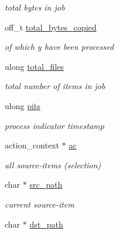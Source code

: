 \begin{CompactItemize}
\begin{CompactList}\small\item\em total bytes in job \item\end{CompactList}\item 
\hypertarget{struct__noir__job_o12}{
off\_\-t \hyperlink{struct__noir__job_o12}{total\_\-bytes\_\-copied}}
\label{struct__noir__job_o12}

\begin{CompactList}\small\item\em of which y have been processed \item\end{CompactList}\item 
\hypertarget{struct__noir__job_o13}{
ulong \hyperlink{struct__noir__job_o13}{total\_\-files}}
\label{struct__noir__job_o13}

\begin{CompactList}\small\item\em total number of items in job \item\end{CompactList}\item 
\hypertarget{struct__noir__job_o14}{
ulong \hyperlink{struct__noir__job_o14}{pits}}
\label{struct__noir__job_o14}

\begin{CompactList}\small\item\em process indicator timestamp \item\end{CompactList}\item 
\hypertarget{struct__noir__job_o15}{
action\_\-context $\ast$ \hyperlink{struct__noir__job_o15}{ac}}
\label{struct__noir__job_o15}

\begin{CompactList}\small\item\em all source-items (selection) \item\end{CompactList}\item 
\hypertarget{struct__noir__job_o16}{
char $\ast$ \hyperlink{struct__noir__job_o16}{src\_\-path}}
\label{struct__noir__job_o16}

\begin{CompactList}\small\item\em current source-item \item\end{CompactList}\item 
\hypertarget{struct__noir__job_o17}{
char $\ast$ \hyperlink{struct__noir__job_o17}{dst\_\-path}}
\label{struct__noir__job_o17}


\end{CompactItemize}
